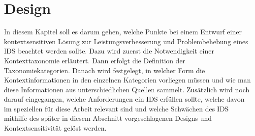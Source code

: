 \chapter{Design}%
\label{cha:design}

In diesem Kapitel soll es darum gehen, welche Punkte bei einem Entwurf einer kontextsensitiven Lösung zur Leistungsverbesserung und Problembehebung eines IDS beachtet werden sollte. Dazu wird zuerst die Notwendigkeit einer Kontexttaxonomie erläutert. Dann erfolgt die Definition der Taxonomiekategorien. Danach wird festgelegt, in welcher Form die Kontextinformationen in den einzelnen Kategorien vorliegen müssen und wie man diese Informationen aus unterschiedlichen Quellen sammelt. Zusätzlich wird noch darauf eingegangen, welche Anforderungen ein IDS erfüllen sollte, welche davon im speziellen für diese Arbeit relevant sind und welche Schwächen des IDS mithilfe des später in diesem Abschnitt vorgeschlagenen Designs und Kontextsensitivität gelöst werden.

